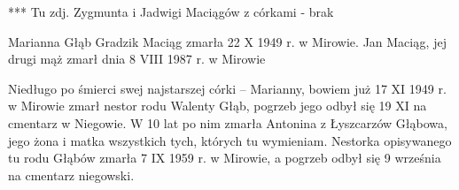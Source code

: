 {\color{red}
*** Tu zdj. Zygmunta i Jadwigi Maciągów z córkami - brak}

Marianna Głąb Gradzik Maciąg zmarła 22 X 1949 r. w Mirowie. Jan Maciąg, jej drugi mąż zmarł dnia 8 VIII 1987 r. w Mirowie

Niedługo po śmierci swej najstarszej córki -- Marianny, bowiem już 17 XI 1949 r. w Mirowie zmarł nestor rodu Walenty Głąb, pogrzeb jego odbył się 19 XI na cmentarz w Niegowie. W 10 lat po nim zmarła Antonina z Łyszcarzów Głąbowa, jego żona i matka wszystkich tych, których tu wymieniam. Nestorka opisywanego tu rodu Głąbów zmarła 7 IX 1959 r. w Mirowie, a pogrzeb odbył się 9 września na cmentarz niegowski.
